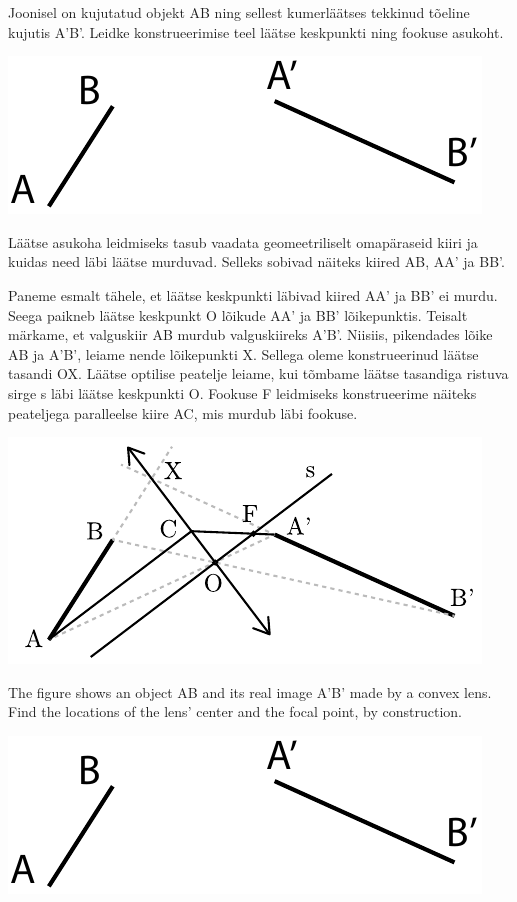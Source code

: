 
Joonisel on kujutatud objekt AB ning sellest kumerläätses tekkinud tõeline kujutis A'B'. Leidke konstrueerimise teel läätse keskpunkti ning fookuse asukoht.

\begin{center}
 \includegraphics[width=0.7\linewidth]{2015-lahg-05-laatsMihkel.pdf}
\end{center}

\hint
Läätse asukoha leidmiseks tasub vaadata geomeetriliselt omapäraseid kiiri ja kuidas need läbi läätse murduvad. Selleks sobivad näiteks kiired AB, AA' ja BB'.

\solu
Paneme esmalt tähele, et läätse keskpunkti läbivad kiired AA' ja BB' ei murdu. Seega paikneb läätse keskpunkt O lõikude AA' ja BB' lõikepunktis. Teisalt märkame, et valguskiir AB murdub valguskiireks A'B'. Niisiis, pikendades lõike AB ja A'B', leiame nende lõikepunkti X. Sellega oleme konstrueerinud läätse tasandi OX. Läätse optilise peatelje leiame, kui tõmbame läätse tasandiga ristuva sirge s läbi läätse keskpunkti O. Fookuse F leidmiseks konstrueerime näiteks peateljega paralleelse kiire AC, mis murdub läbi fookuse.

\begin{center}
\includegraphics[width=\textwidth]{2015-lahg-05-laatsLahendus.pdf}
\end{center}

The figure shows an object AB and its real image A’B’ made by a convex lens. Find the locations of the lens’ center and the focal point, by construction.
\begin{center}
 \includegraphics[width=0.7\linewidth]{2015-lahg-05-laatsMihkel}
\end{center}

